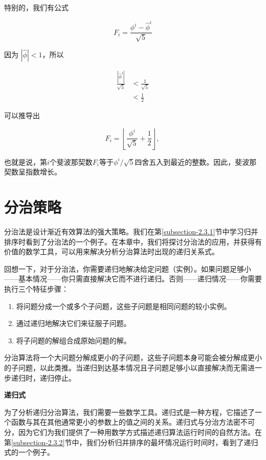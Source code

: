 \documentclass[lang=cn,newtx,10pt,scheme=chinese]{elegantbook}
\begin{document}
特别的，我们有公式

$$
F_i=\frac{\phi^i-\widehat{\phi}^i}{\sqrt{5}}
$$

因为 $|\hat{\phi}|<1$，所以

$$
\begin{aligned}
\frac{\left|\hat{\phi}^i\right|}{\sqrt{5}} & <\frac{1}{\sqrt{5}} \\
& <\frac{1}{2}
\end{aligned}
$$

可以推导出

\begin{equation}
F_i=\left\lfloor\frac{\phi^i}{\sqrt{5}}+\frac{1}{2}\right\rfloor \text {, }
\end{equation}

也就是说，第$i$个斐波那契数$F_i$等于$\phi^i / \sqrt{5}$四舍五入到最近的整数。因此，斐波那契数呈指数增长。

\chapter{分治策略}\label{chapter-04}

分治法是设计渐近有效算法的强大策略。我们在第\ref{subsection-2.3.1}节中学习归并排序时看到了分治法的一个例子。在本章中，我们将探讨分治法的应用，并获得有价值的数学工具，可以用来解决分析分治算法时出现的递归关系式。

回想一下，对于分治法，你需要递归地解决给定问题（实例）。如果问题足够小——基本情况——你只需直接解决它而不进行递归。否则——递归情况——你需要执行三个特征步骤：

\begin{enumerate}
\item 将问题分成一个或多个子问题，这些子问题是相同问题的较小实例。
\item 通过递归地解决它们来征服子问题。
\item 将子问题的解组合成原始问题的解。
\end{enumerate}

分治算法将一个大问题分解成更小的子问题，这些子问题本身可能会被分解成更小的子问题，以此类推。当递归到达基本情况且子问题足够小以直接解决而无需进一步递归时，递归停止。

\textbf{递归式}

为了分析递归分治算法，我们需要一些数学工具。递归式是一种方程，它描述了一个函数与其在其他通常更小的参数上的值之间的关系。递归式与分治方法密不可分，因为它们为我们提供了一种用数学方式描述递归算法运行时间的自然方法。在第\ref{subsection-2.3.2}节中，我们分析归并排序的最坏情况运行时间时，看到了递归式的一个例子。
\end{document}
